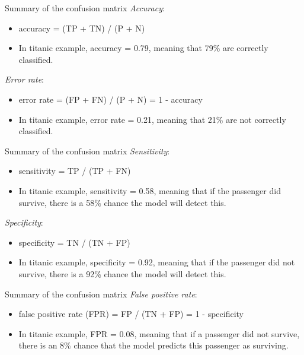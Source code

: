 \documentclass[10pt]{beamer}\usepackage[]{graphicx}\usepackage[]{xcolor}
\begin{document}

\begin{frame}[fragile]{Summary of the confusion matrix}
\emph{Accuracy}:
\begin{itemize}
\item accuracy = (TP + TN) / (P + N)
\item In titanic example, accuracy = 0.79, meaning that 79\% are correctly classified.
\end{itemize}
\va
\emph{Error rate}:
\begin{itemize}
\item error rate = (FP + FN) / (P + N) = 1 - accuracy
\item In titanic example, error rate = 0.21, meaning that 21\% are not correctly classified.
\end{itemize}
\end{frame}


\begin{frame}[fragile]{Summary of the confusion matrix}
\emph{Sensitivity}:
\begin{itemize}
\item sensitivity = TP / (TP + FN)
\item In titanic example, sensitivity = 0.58, meaning that if the passenger did survive, there is a 58\% chance the model will detect this.
\end{itemize}
\va
\emph{Specificity}:
\begin{itemize}
\item specificity = TN / (TN + FP)
\item In titanic example, specificity = 0.92, meaning that if the passenger did not survive, there is a 92\% chance the model will detect this. 
\end{itemize}

\end{frame}


\begin{frame}[fragile]{Summary of the confusion matrix}
\emph{False positive rate}:
\begin{itemize}
\item false positive rate (FPR) = FP / (TN + FP) = 1 - specificity
\item In titanic example, FPR = 0.08, meaning that if a passenger did not survive, there is an 8\% chance that the model predicts this passenger as surviving. 
\end{itemize}
\end{frame}
\end{document}

